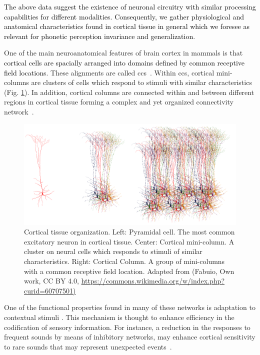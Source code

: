 \documentclass[10pt,letterpaper]{article}
\newcommand{\reviewertwo}[1]{\textcolor{black}{#1}}
\newcommand{\reviewerfive}[1]{\textcolor{black}{#1}}
\begin{document}
\reviewerfive{The above data suggest the existence of neuronal circuitry with similar processing capabilities for different modalities. Consequently, we gather physiological and anatomical characteristics found in cortical tissue in general which we foresee as relevant for phonetic perception invariance and generalization}.

One of the main neuroanatomical features of brain cortex in mammals is that \reviewertwo{cortical cells are spacially arranged into domains defined by common receptive field locations}. These alignments are called \glspl{cc}~\cite{mountcastle_1955, mountcastle_1957, hubel_1962, hubel_1968}. Within \glspl{cc}, cortical mini-columns are clusters of cells which respond to stimuli with similar characteristics (Fig. \ref{fig:Biological}). In addition, cortical columns are connected within and between different regions in cortical tissue forming a complex and yet organized connectivity network~\cite{mountcastle_1997}. 

\begin{figure}[h!]
    \centering
    \includegraphics[width=1.0\textwidth]{Biological.png}
    \caption{Cortical tissue organization. Left: Pyramidal cell. The most common excitatory neuron in cortical tissue.
    Center: Cortical mini-column. A cluster on neural cells which responds to stimuli of similar characteristics.
    Right: Cortical Column. A group of mini-columns with a common receptive field location.
    Adapted from (Fabuio, Own work, CC BY 4.0, \url{https://commons.wikimedia.org/w/index.php?curid=60707501)}}
    \label{fig:Biological}
\end{figure}

One of the functional properties found in many of these networks is adaptation to contextual stimuli \cite{KRAUSE201436,doi:10.1167/16.13.1}. This mechanism is thought to enhance efficiency in the codification of sensory information. For instance, a reduction in the responses to frequent sounds by means of inhibitory networks, may enhance cortical sensitivity to rare sounds that may represent unexpected events~\cite{Natan2015ComplementaryCO,nachum_2003,Javitt11962}.
\end{document}
